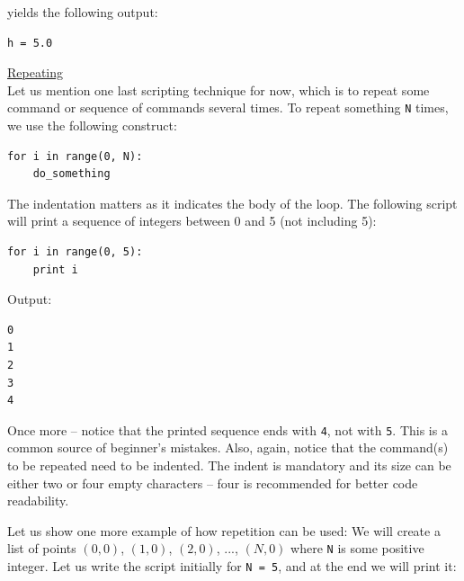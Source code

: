 \noindent
yields the following output:\\

\begin{bbox}
\begin{verbatim}
h = 5.0
\end{verbatim}
\end{bbox} 
\vspace{6mm}

\noindent
\underline{Repeating}\\

\noindent
Let us mention one last scripting technique for now, which is to repeat 
some command or sequence of commands several times. To repeat something 
{\tt N} times, we use the following construct: \\

\begin{bbox}
\begin{verbatim}
for i in range(0, N):
    do_something
\end{verbatim}
\end{bbox}
\vspace{6mm}

\noindent
The indentation matters as it indicates the body of the loop.
The following script will print a sequence of integers between 
0 and 5 (not including 5):\\

\begin{bbox}
\begin{verbatim}
for i in range(0, 5):
    print i
\end{verbatim}
\end{bbox}
\vspace{6mm}

\noindent
Output:\\

\begin{ybox}
\begin{verbatim}
0
1
2
3
4
\end{verbatim}
\end{ybox}
\vspace{6mm}

\noindent
Once more -- notice that the printed sequence ends with {\tt 4}, not with {\tt 5}.
This is a common source of beginner's mistakes.
Also, again, notice that the command(s) to be repeated need to be indented. The indent is mandatory and 
its size can be either two or four empty characters -- four is recommended for better
code readability.

Let us show one more example of how repetition can be used: We will create a list of 
points $(0, 0)$, $(1, 0)$, $(2, 0)$, ..., $(N, 0)$ where {\tt N} is some positive integer. Let us
write the script initially for {\tt N = 5}, and at the end we will print it:\\

